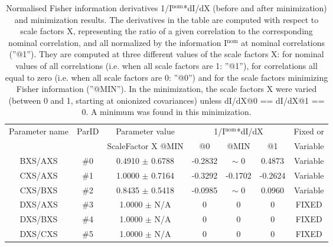 \begin{table}[H]
\scriptsize
\begin{center}
\renewcommand{\arraystretch}{1.1}
\begin{tabular}{|c|c|c|ccc|c|}
\hline
Parameter name & ParID & Parameter value &\multicolumn{3}{|c|}{1/I$^\mathrm{nom}$*dI/dX} & Fixed or\\
 & & ScaleFactor X @MIN & @0 & @MIN & @1 & Variable\\
\hline
 {\tiny BXS/AXS} & \#0 &    0.4910 $\pm$    0.6788 &   -0.2832 & {\tiny $\sim$ }0 &    0.4873 & Variable \\
 {\tiny CXS/AXS} & \#1 &    1.0000 $\pm$    0.7164 &   -0.3292 &   -0.1702 &   -0.2624 & Variable \\
 {\tiny CXS/BXS} & \#2 &    0.8435 $\pm$    0.5418 &   -0.0985 & {\tiny $\sim$ }0 &    0.0960 & Variable \\
 {\tiny DXS/AXS} & \#3 &    1.0000 $\pm$ N/A & 0 & 0 & 0 & FIXED \\
 {\tiny DXS/BXS} & \#4 &    1.0000 $\pm$ N/A & 0 & 0 & 0 & FIXED \\
 {\tiny DXS/CXS} & \#5 &    1.0000 $\pm$ N/A & 0 & 0 & 0 & FIXED \\
\hline
\end{tabular}
\renewcommand{\arraystretch}{1}
\caption{Normalised Fisher information derivatives 1/I$^\mathrm{nom}$*dI/dX (before and after minimization) and minimization results.  The derivatives in the table are computed with respect to scale factors X, representing the ratio of a given correlation to the corresponding nominal correlation, and all normalized by the information I$^\mathrm{nom}$ at nominal correlations (''@1''). They are computed at three different values of the scale factors X: for nominal values of all correlations (i.e. when all scale factors are 1: ''@1''), for correlations all equal to zero (i.e. when all scale factors are 0: ''@0'') and for the scale factors minimizing Fisher information (''@MIN''). In the minimization, the scale factors X were varied (between 0 and 1, starting at onionized covariances) unless dI/dX@0 == dI/dX@1 == 0. A minimum was found in this minimization.}
\end{center}
\end{table}
